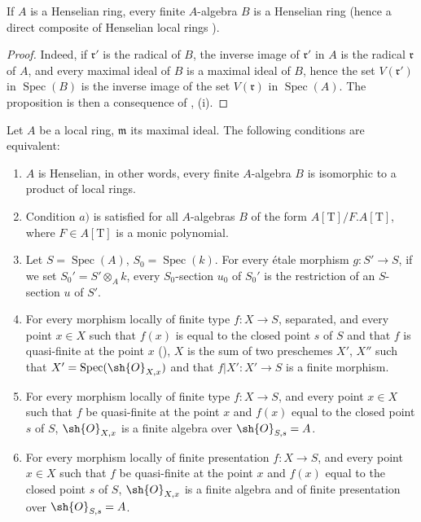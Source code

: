 \begin{proposition}[18.5.10]
\label{IV.18.5.10}
If $A$ is a Henselian ring, every finite $A$-algebra $B$ is a Henselian ring (hence a direct composite of Henselian local rings ).
\end{proposition}

\begin{proof}
Indeed, if $\mathfrak{r}'$ is the radical of $B$, the inverse image of $\mathfrak{r}'$ in $A$ is the radical $\mathfrak{r}$ of $A$, and every maximal ideal of $B$ is a maximal ideal of $B$, hence the set $V(\mathfrak{r}')$ in $\operatorname{Spec}(B)$ is the inverse image of the set $V(\mathfrak{r})$ in $\operatorname{Spec}(A)$.
The proposition is then a consequence of , (i).
\end{proof}

\begin{theorem}[18.5.11]
\label{IV.18.5.11}
Let $A$ be a local ring, $\mathfrak{m}$ its maximal ideal.
The following conditions are equivalent:
\begin{enumerate}[label=\emph{\alph*)}]
  \item $A$ is Henselian, in other words, every finite $A$-algebra $B$ is isomorphic to a product of local rings.
  \item[a$'$)] Condition $a)$ is satisfied for all $A$-algebras $B$ of the form $A[\mathrm{T}]/F.A[\mathrm{T}]$, where $F\in A[\mathrm{T}]$ is a monic polynomial.
  \item Let $S=\operatorname{Spec}(A)$, $S_0=\operatorname{Spec}(k)$.
For every \'etale morphism $g:S'\to S$, if we set $S_0'=S'\otimes_A k$, every $S_0$-section $u_0$ of $S_0'$ is the restriction of an $S$-section $u$ of $S'$.
  \item For every morphism locally of finite type $f:X\to S$, separated, and every point $x\in X$ such that $f(x)$ is equal to the closed point $s$ of $S$ and that $f$ is quasi-finite at the point $x$ (), $X$ is the sum of two preschemes $X'$, $X''$ such that $X'=\operatorname{Spec}(\sh{O}_{X,x})$ and that $f|X':X'\to S$ is a finite morphism.
  \item[c$'$)] For every morphism locally of finite type $f:X\to S$, and every point $x\in X$ such that $f$ be quasi-finite at the point $x$ and $f(x)$ equal to the closed point $s$ of $S$, $\sh{O}_{X,x}$ is a finite algebra over $\sh{O}_{S,s}=A$.
  \item[c$''$)] For every morphism locally of finite presentation $f:X\to S$, and every point $x\in X$ such that $f$ be quasi-finite at the point $x$ and $f(x)$ equal to the closed point $s$ of $S$, $\sh{O}_{X,x}$ is a finite algebra and of finite presentation over $\sh{O}_{S,s}=A$.
\end{enumerate}
\end{theorem}

